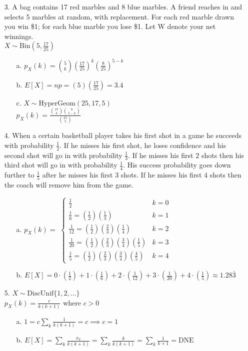 \documentclass[11pt]{amsart}
\theoremstyle{definition}
\begin{document}
\begin{itemize}
\item[3.] A bag contains 17 red marbles and 8 blue marbles. A friend reaches in and selects 5 marbles at random, with replacement. For each red marble drawn you win \$1; for each blue marble you lose \$1. Let W denote your net winnings. \\
$X\sim\text{Bin}(5,\frac{17}{25})$
\begin{itemize}
    \item[a.] $p_X(k)={5\choose k}(\frac{17}{25})^k(\frac8{25})^{5-k}$

    \item[b.] $E[X]=np=(5)(\frac{17}{25})=3.4$

    \item[c.] $X\sim\text{HyperGeom}(25,17,5)$ \\
              $p_X(k)=\frac{{17\choose k}{8\choose {5-k}}}{{25\choose 5}}$

\end{itemize}

\item[4.] When a certain basketball player takes his first shot in a game he succeeds with probability $\frac 12$. If he misses his first shot, he loses confidence and his second shot will go in with probability $\frac 13$. If he misses his first $2$ shots then his third shot will go in with probability $\frac 14$. His success probability goes down further to $\frac 15$ after he misses his first $3$ shots. If he misses his first $4$ shots then the coach will remove him from the game.
\begin{itemize}
    \item[a.] $p_X(k)=$ $\begin{cases}
        \frac12                                         &k=0 \\
        \frac16   =(\frac12)(\frac13)                   &k=1 \\
        \frac1{12}=(\frac12)(\frac23)(\frac14)          &k=2 \\
        \frac1{20}=(\frac12)(\frac23)(\frac34)(\frac15) &k=3 \\
        \frac15   =(\frac12)(\frac23)(\frac34)(\frac45) &k=4
    \end{cases}$

    \item[b.] $E[X]=0\cdot(\frac12)+1\cdot(\frac16)+2\cdot(\frac1{12})+3\cdot(\frac1{20})+4\cdot(\frac15)\approx 1.28\bar3$

\end{itemize}

\item[5.] $X\sim\text{DiscUnif}\{1,2,\ldots\}$ \\
          $p_X(k)=\frac{c}{k(k+1)}$ where $c>0$
\begin{itemize}
    \item[a.] $1=c\sum_k \frac{1}{k(k+1)}=c\implies c=1$

    \item[b.] $E[X]=\sum_k \frac{x_k}{k(k+1)}=\sum_k \frac{k}{k(k+1)}=\sum_k \frac1{k+1}=\text{DNE}$

\end{itemize}

\end{itemize}
\end{document}
